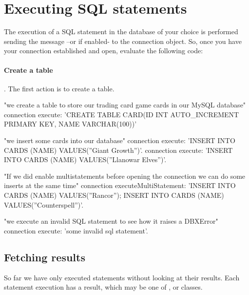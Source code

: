 \documentclass[a4paper,10pt,twoside]{book}
\begin{document}



\section{Executing SQL statements}
The execution of a SQL statement in the database of your choice is performed sending the  message --or  if enabled- to the connection object.  So, once you have your connection established and open,   evaluate the following code:

\paragraph{Create a table}. The first action is to create a table.

\begin{code}{}
"we create a table to store our trading card game cards in our MySQL database"
connection execute: 'CREATE TABLE CARD(ID INT AUTO_INCREMENT PRIMARY KEY, NAME VARCHAR(100))'
\end{code}



\begin{code}{}
"we insert some cards into our database"
connection execute: 'INSERT INTO CARDS (NAME) VALUES(''Giant Growth'')'.
connection execute: 'INSERT INTO CARDS (NAME) VALUES(''Llanowar Elves'')'.

"If we did enable multistatements before opening the connection we can do some inserts at the same time"
connection executeMultiStatement: 'INSERT INTO CARDS (NAME) VALUES(''Rancor'');
                                   INSERT INTO CARDS (NAME) VALUES(''Counterspell'')'.

"we execute an invalid SQL statement to see how it raises a DBXError"
connection execute: 'some invalid sql statement'.
\end{code}

\subsection{Fetching results}
So far we have only executed statements without looking at their results.  Each statement execution has a result, which may be one of ,  or  classes.
\end{document}
